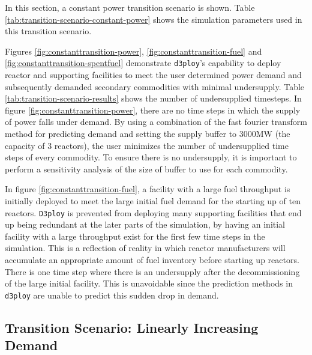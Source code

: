 \documentclass{anstrans}
\newcommand{\deploy}{\texttt{d3ploy}\xspace}%
\newcommand{\Deploy}{\texttt{D3ploy}\xspace}%
\begin{document}
In this section, a constant power transition scenario is shown. 
Table \ref{tab:transition-scenario-constant-power} shows the 
simulation parameters used in this transition scenario. 

Figures \ref{fig:constanttransition-power}, \ref{fig:constanttransition-fuel}
and \ref{fig:constanttransition-spentfuel} demonstrate \deploy's capability 
to deploy reactor and supporting facilities to meet the user 
determined power demand and subsequently demanded secondary commodities 
with minimal undersupply. 
Table \ref{tab:transition-scenario-results} shows the number of 
undersupplied timesteps. 
In figure \ref{fig:constanttransition-power}, there are no time steps
in which the supply of power falls under demand.
By using a combination of the fast fourier transform method for predicting 
demand and setting the supply buffer to 3000MW (the capacity of 3 reactors), 
the user minimizes the number of undersupplied time steps of every commodity. 
To ensure there is no undersupply, it is important to perform a
sensitivity analysis of the size 
of buffer to use for each commodity. 

In figure \ref{fig:constanttransition-fuel},
a facility with a large fuel throughput is initially
deployed to meet the large initial fuel demand for the starting
up of ten reactors. 
\Deploy is prevented from deploying many supporting
facilities that end up being redundant at the later parts of 
the simulation, by having an initial facility with a large throughput
exist for the first few time steps in the simulation.
This is a reflection of reality in which reactor manufacturers will 
accumulate an appropriate amount of fuel inventory before starting 
up reactors. 
There is one time step where there is an undersupply after the 
decommissioning of the large initial facility.  
This is unavoidable since the prediction methods in \deploy are 
unable to predict this sudden drop in demand. 


\subsection{\textbf{Transition Scenario: Linearly Increasing Demand}}
\end{document}
